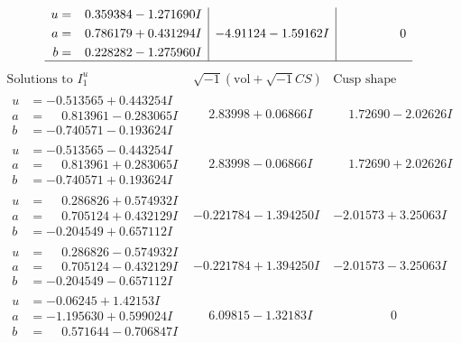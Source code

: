 \documentclass[1p]{elsarticle_modified}
\theoremstyle{definition}
\newcommand{\I}{\sqrt{-1}}
\begin{document}
$$\begin{array}{c|c|c}
\begin{aligned}
u &= \phantom{-}0.359384 - 1.271690 I \\
a &= \phantom{-}0.786179 + 0.431294 I \\
b &= \phantom{-}0.228282 - 1.275960 I\end{aligned}
 & -4.91124 - 1.59162 I & \phantom{-0.000000 } 0\\
 \hline 
 \end{array}$$\newpage$$\begin{array}{c|c|c}  
\text{Solutions to }I^u_{1}& \I (\text{vol} + \sqrt{-1}CS) & \text{Cusp shape}\\
 \hline 
\begin{aligned}
u &= -0.513565 + 0.443254 I \\
a &= \phantom{-}0.813961 - 0.283065 I \\
b &= -0.740571 - 0.193624 I\end{aligned}
 & \phantom{-}2.83998 + 0.06866 I & \phantom{-}1.72690 - 2.02626 I \\ \hline\begin{aligned}
u &= -0.513565 - 0.443254 I \\
a &= \phantom{-}0.813961 + 0.283065 I \\
b &= -0.740571 + 0.193624 I\end{aligned}
 & \phantom{-}2.83998 - 0.06866 I & \phantom{-}1.72690 + 2.02626 I \\ \hline\begin{aligned}
u &= \phantom{-}0.286826 + 0.574932 I \\
a &= \phantom{-}0.705124 + 0.432129 I \\
b &= -0.204549 + 0.657112 I\end{aligned}
 & -0.221784 - 1.394250 I & -2.01573 + 3.25063 I \\ \hline\begin{aligned}
u &= \phantom{-}0.286826 - 0.574932 I \\
a &= \phantom{-}0.705124 - 0.432129 I \\
b &= -0.204549 - 0.657112 I\end{aligned}
 & -0.221784 + 1.394250 I & -2.01573 - 3.25063 I \\ \hline\begin{aligned}
u &= -0.06245 + 1.42153 I \\
a &= -1.195630 + 0.599024 I \\
b &= \phantom{-}0.571644 - 0.706847 I\end{aligned}
 & \phantom{-}6.09815 - 1.32183 I & \phantom{-0.000000 } 0 \\ \hline\begin{aligned}

\end{aligned}
\end{array}$$
\end{document}
